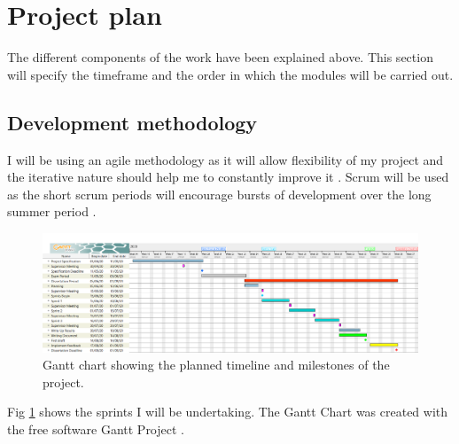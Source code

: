 \documentclass{article}
\begin{document}
\section{Project plan}
% 

The different components of the work have been explained above.
This section will specify the timeframe and the order in which the modules will be carried out.

\subsection{Development methodology}



I will be using an agile methodology as it will allow flexibility of my project and the iterative nature should help me to constantly improve it \cite{beck2001manifesto}. 
Scrum will be used as the short scrum periods will encourage bursts of development over the long summer period \cite{schwaber1997scrum}.

\begin{figure}[ht]
    \centering
    \centerline{
        \includegraphics[scale=0.32]{GanttChart.PNG}
    }
    \caption{Gantt chart showing the planned timeline and milestones of the project.}
    \label{fig:Gantt}
\end{figure}

Fig \ref{fig:Gantt} shows the sprints I will be undertaking.
The Gantt Chart was created with the free software Gantt Project \cite{GanttProject}.
\end{document}
